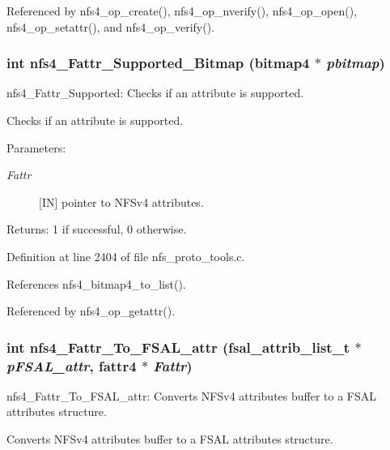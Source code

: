 Referenced by nfs4\_\-op\_\-create(), nfs4\_\-op\_\-nverify(), nfs4\_\-op\_\-open(), nfs4\_\-op\_\-setattr(), and nfs4\_\-op\_\-verify().
\subsubsection{\setlength{\rightskip}{0pt plus 5cm}int nfs4\_\-Fattr\_\-Supported\_\-Bitmap (bitmap4 $\ast$ {\em pbitmap})}\label{nfs__proto__tools_8c_a23}


nfs4\_\-Fattr\_\-Supported: Checks if an attribute is supported.

Checks if an attribute is supported.

\begin{Desc}
\item[Parameters:]
\begin{description}
\item[{\em Fattr}][IN] pointer to NFSv4 attributes.\end{description}
\end{Desc}
\begin{Desc}
\item[Returns:]1 if successful, 0 otherwise. \end{Desc}


Definition at line 2404 of file nfs\_\-proto\_\-tools.c.

References nfs4\_\-bitmap4\_\-to\_\-list().

Referenced by nfs4\_\-op\_\-getattr().
\subsubsection{\setlength{\rightskip}{0pt plus 5cm}int nfs4\_\-Fattr\_\-To\_\-FSAL\_\-attr (fsal\_\-attrib\_\-list\_\-t $\ast$ {\em p\-FSAL\_\-attr}, fattr4 $\ast$ {\em Fattr})}\label{nfs__proto__tools_8c_a25}


nfs4\_\-Fattr\_\-To\_\-FSAL\_\-attr: Converts NFSv4 attributes buffer to a FSAL attributes structure.

Converts NFSv4 attributes buffer to a FSAL attributes structure.

